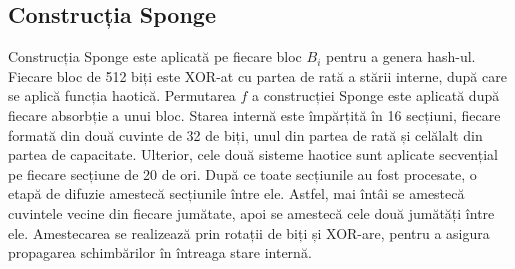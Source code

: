 \subsection{Construcția Sponge}
Construcția Sponge este aplicată pe fiecare bloc $B_i$ pentru a genera hash-ul.
Fiecare bloc de 512 biți este XOR-at cu partea de rată a stării interne, după care se aplică funcția haotică.
Permutarea $f$ a construcției Sponge este aplicată după fiecare absorbție a unui bloc.
Starea internă este împărțită în 16 secțiuni, fiecare formată din două cuvinte de 32 de biți, unul din partea de rată și celălalt din partea de capacitate.
Ulterior, cele două sisteme haotice sunt aplicate secvențial pe fiecare secțiune de 20 de ori.
După ce toate secțiunile au fost procesate, o etapă de difuzie amestecă secțiunile între ele.
Astfel, mai întâi se amestecă cuvintele vecine din fiecare jumătate, apoi se amestecă cele două jumătăți între ele.
Amestecarea se realizează prin rotații de biți și XOR-are, pentru a asigura propagarea schimbărilor în întreaga stare internă.

\begin{algorithm}[!hbpt]
\caption{Permutarea stării}
\label{alg:chaos}
\end{algorithm}

